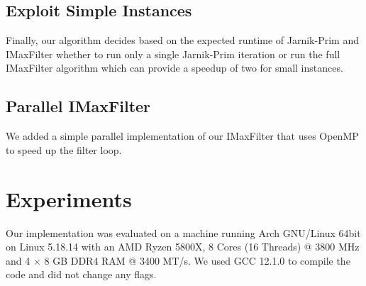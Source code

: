 \documentclass{article}
\begin{document}
\subsection{Exploit Simple Instances}
Finally, our algorithm decides based on the expected runtime of Jarnik-Prim and IMaxFilter whether to run only a single Jarnik-Prim iteration or run the full IMaxFilter algorithm which can provide a speedup of two for small instances.

\subsection{Parallel IMaxFilter}
We added a simple parallel implementation of our IMaxFilter that uses OpenMP to speed up the filter loop.

\section{Experiments}
Our implementation was evaluated on a machine running Arch GNU/Linux 64bit on Linux 5.18.14 with an AMD Ryzen 5800X, 8 Cores (16 Threads) @ 3800 MHz and 4 $\times$ 8 GB DDR4 RAM @ 3400 MT/s.
We used GCC 12.1.0 to compile the code and did not change any flags.
\end{document}
